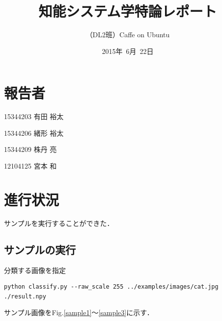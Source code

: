 \documentclass[a4paper,10pt]{jsarticle}
\title{知能システム学特論レポート}
\author{
（DL2班）Caffe on Ubuntu\\
}
\date{2015年\ 6月\ 22日}
\begin{document}
\section{報告者}
\begin{list}{}{}
 \item 15344203\hspace{0.5cm} 有田 裕太
 \item 15344206\hspace{0.5cm} 緒形 裕太
 \item 15344209\hspace{0.5cm} 株丹 亮
 \item 12104125\hspace{0.5cm} 宮本 和
\end{list}

\section{進行状況}
サンプルを実行することができた．

\subsection{サンプルの実行}

分類する画像を指定
\begin{lstlisting}[basicstyle=\ttfamily\footnotesize, frame=single]
python classify.py --raw_scale 255 ../examples/images/cat.jpg ./result.npy
\end{lstlisting}

サンプル画像をFig.\ref{sample1}〜\ref{sample3}に示す．
\end{document}
